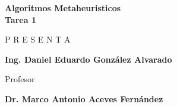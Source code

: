 \begin{titlepage}
    \vspace{1.5cm}
    
        {\Large \bfseries Algoritmos Metaheuristicos \\ Tarea 1\par}
    
    \vfill
    
    {\large P R E S E N T A} \par
    \vspace{0.5cm}
    {\Large \bfseries Ing. Daniel Eduardo González Alvarado\par}
    
    \vspace{2cm}
    
    {\large Profesor}\par
    \vspace{0.5cm}
    {\Large \bfseries Dr. Marco Antonio Aceves Fernández\par}
    
    \vfill
    
    
\end{titlepage}